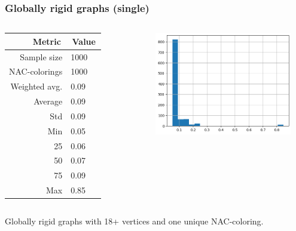 \documentclass[aspectratio=\myaspectratio]{beamer}
\begin{document}
\begin{frame}
	\frametitle{Globally rigid graphs (single)}
	\begin{columns}

		\begin{table}[ht]
			\centering
			\begin{tabular}{r|l}
				\toprule
				\,Metric\,    & \,Value\, \\
				\midrule
				Sample size   & 1000      \\
				NAC-colorings & 1000      \\
				Weighted avg. & 0.09      \\
				Average       & 0.09      \\
				Std           & 0.09      \\
				Min           & 0.05      \\
				25            & 0.06      \\
				50            & 0.07      \\
				75            & 0.09      \\
				Max           & 0.85      \\
				\bottomrule
			\end{tabular}
		\end{table}


		\includegraphics[width=0.9\textwidth]{./assets/presentation_reviewer_globally_rigid_single.png}

	\end{columns}

	\centering
	Globally rigid graphs with 18+ vertices and one unique NAC-coloring.
\end{frame}
\end{document}
